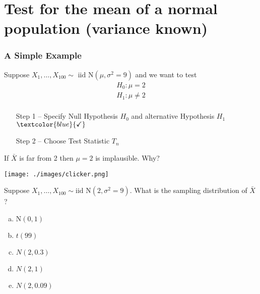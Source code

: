 \section{Test for the mean of a normal population (variance known)}
\begin{frame}
  \frametitle{A Simple Example}
  
  Suppose $X_1, \dots, X_{100} \sim \mbox{ iid N}(\mu, \sigma^2 = 9)$ and we want to test
  \[
    \begin{array}{c}
      H_0\colon \mu = 2\\
      H_1\colon \mu \neq 2\\
    \end{array}
  \]

  \pause

  \begin{enumerate}
    \item[Step 1] -- Specify Null Hypothesis $H_0$ and alternative Hypothesis $H_1$ $\textcolor{blue}{\checkmark}$\pause
    \item[Step 2] -- \alert{Choose Test Statistic $T_n$}
  \end{enumerate}

  \pause

  If $\bar{X}$ is far from 2 then $\mu=2$ is implausible. Why?

\end{frame}
\begin{frame}{\texttt{[image: ./images/clicker.png]}}

  Suppose $X_1, \dots, X_{100} \sim \mbox{iid N}(2, \sigma^2 = 9)$. What is the sampling distribution of $\bar{X}$?
  
  \begin{enumerate}[(a)]
    \item $\mbox{N}(0,1)$
    \item $t(99)$
    \item $N(2,0.3)$
    \item $N(2,1)$
    \item $N(2, 0.09)$ 
  \end{enumerate}

\end{frame}
